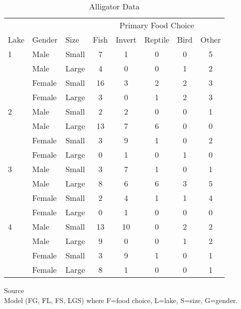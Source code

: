 \documentclass[a4paper]{article}
\begin{document}
\begin{appendix}
\begin{table}[H]
\begin{center}
\begin{tabular}{lllccccc} \hline
& & & \multicolumn{5}{c}{Primary Food Choice} \\ \cline{4-8}
Lake & Gender & Size & Fish & Invert & Reptile & Bird & Other \\ \hline
1 & Male   & Small & 7  & 1  & 0 & 0 & 5 \\
  & Male   & Large & 4  & 0  & 0 & 1 & 2 \\
  & Female & Small & 16 & 3  & 2 & 2 & 3 \\
  & Female & Large & 3  & 0  & 1 & 2 & 3 \\
2 & Male   & Small & 2  & 2  & 0 & 0 & 1 \\
  & Male   & Large & 13 & 7  & 6 & 0 & 0 \\
  & Female & Small & 3  & 9  & 1 & 0 & 2 \\
  & Female & Large & 0  & 1  & 0 & 1 & 0 \\
3 & Male   & Small & 3  & 7  & 1 & 0 & 1 \\
  & Male   & Large & 8  & 6  & 6 & 3 & 5 \\
  & Female & Small & 2  & 4  & 1 & 1 & 4 \\
  & Female & Large & 0  & 1  & 0 & 0 & 0 \\
4 & Male   & Small & 13 & 10 & 0 & 2 & 2 \\
  & Male   & Large & 9  &  0 & 0 & 1 & 2 \\
  & Female & Small & 3  &  9 & 1 & 0 & 1 \\
  & Female & Large & 8  &  1 & 0 & 0 & 1 \\ \hline      
\end{tabular}
\end{center}
\caption{Alligator Data}
\label{tab:alli}
Source \cite{agre:1990} \\
Model (FG, FL, FS, LGS) where F=food choice, L=lake, S=size, G=gender.
\end{table}


\end{appendix}
\end{document}
